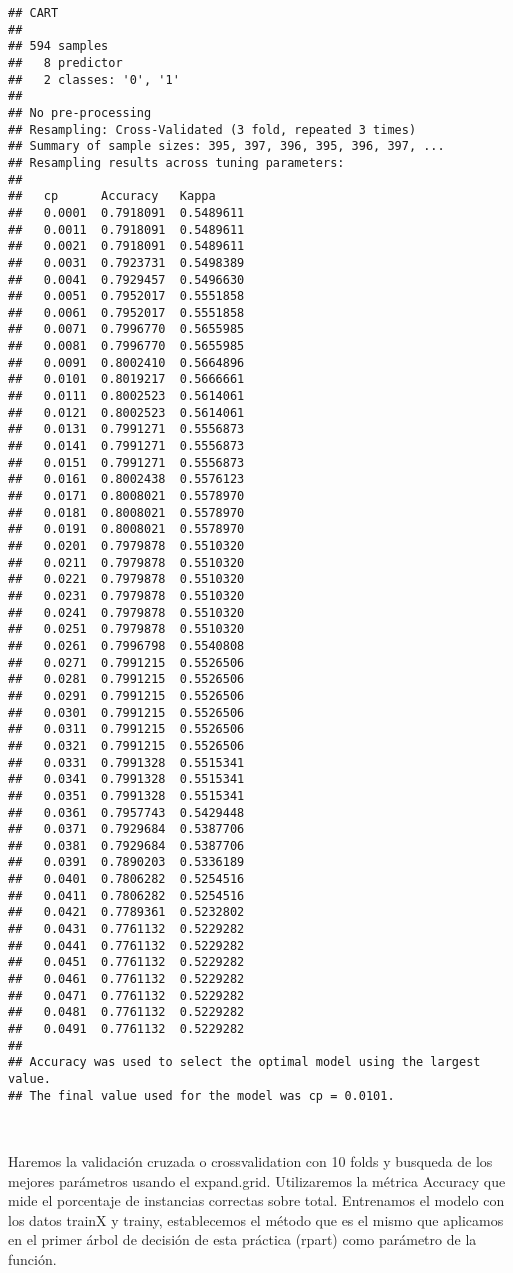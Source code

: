 \documentclass[
]{article}
\begin{document}
\begin{verbatim}
## CART 
## 
## 594 samples
##   8 predictor
##   2 classes: '0', '1' 
## 
## No pre-processing
## Resampling: Cross-Validated (3 fold, repeated 3 times) 
## Summary of sample sizes: 395, 397, 396, 395, 396, 397, ... 
## Resampling results across tuning parameters:
## 
##   cp      Accuracy   Kappa    
##   0.0001  0.7918091  0.5489611
##   0.0011  0.7918091  0.5489611
##   0.0021  0.7918091  0.5489611
##   0.0031  0.7923731  0.5498389
##   0.0041  0.7929457  0.5496630
##   0.0051  0.7952017  0.5551858
##   0.0061  0.7952017  0.5551858
##   0.0071  0.7996770  0.5655985
##   0.0081  0.7996770  0.5655985
##   0.0091  0.8002410  0.5664896
##   0.0101  0.8019217  0.5666661
##   0.0111  0.8002523  0.5614061
##   0.0121  0.8002523  0.5614061
##   0.0131  0.7991271  0.5556873
##   0.0141  0.7991271  0.5556873
##   0.0151  0.7991271  0.5556873
##   0.0161  0.8002438  0.5576123
##   0.0171  0.8008021  0.5578970
##   0.0181  0.8008021  0.5578970
##   0.0191  0.8008021  0.5578970
##   0.0201  0.7979878  0.5510320
##   0.0211  0.7979878  0.5510320
##   0.0221  0.7979878  0.5510320
##   0.0231  0.7979878  0.5510320
##   0.0241  0.7979878  0.5510320
##   0.0251  0.7979878  0.5510320
##   0.0261  0.7996798  0.5540808
##   0.0271  0.7991215  0.5526506
##   0.0281  0.7991215  0.5526506
##   0.0291  0.7991215  0.5526506
##   0.0301  0.7991215  0.5526506
##   0.0311  0.7991215  0.5526506
##   0.0321  0.7991215  0.5526506
##   0.0331  0.7991328  0.5515341
##   0.0341  0.7991328  0.5515341
##   0.0351  0.7991328  0.5515341
##   0.0361  0.7957743  0.5429448
##   0.0371  0.7929684  0.5387706
##   0.0381  0.7929684  0.5387706
##   0.0391  0.7890203  0.5336189
##   0.0401  0.7806282  0.5254516
##   0.0411  0.7806282  0.5254516
##   0.0421  0.7789361  0.5232802
##   0.0431  0.7761132  0.5229282
##   0.0441  0.7761132  0.5229282
##   0.0451  0.7761132  0.5229282
##   0.0461  0.7761132  0.5229282
##   0.0471  0.7761132  0.5229282
##   0.0481  0.7761132  0.5229282
##   0.0491  0.7761132  0.5229282
## 
## Accuracy was used to select the optimal model using the largest value.
## The final value used for the model was cp = 0.0101.
\end{verbatim}

\texttt{}~\\
\texttt{}

Haremos la validación cruzada o crossvalidation con 10 folds y busqueda
de los mejores parámetros usando el expand.grid. Utilizaremos la métrica
Accuracy que mide el porcentaje de instancias correctas sobre total.
Entrenamos el modelo con los datos trainX y trainy, establecemos el
método que es el mismo que aplicamos en el primer árbol de decisión de
esta práctica (rpart) como parámetro de la función.
\end{document}

